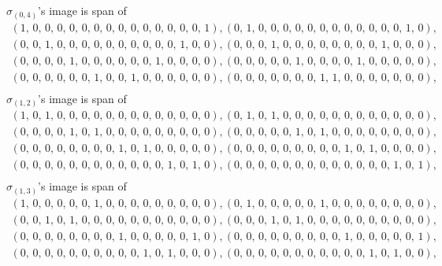 \documentclass[8pt]{article}\usepackage{amsmath}
\begin{document}
\( \sigma_{(0, 4)}\)'s image is span of   
\begin{align*} \left(1,\,0,\,0,\,0,\,0,\,0,\,0,\,0,\,0,\,0,\,0,\,0,\,0,\,0,\,0,\,1\right) , \left(0,\,1,\,0,\,0,\,0,\,0,\,0,\,0,\,0,\,0,\,0,\,0,\,0,\,0,\,1,\,0\right) , \\ 
 \left(0,\,0,\,1,\,0,\,0,\,0,\,0,\,0,\,0,\,0,\,0,\,0,\,0,\,1,\,0,\,0\right) , \left(0,\,0,\,0,\,1,\,0,\,0,\,0,\,0,\,0,\,0,\,0,\,0,\,1,\,0,\,0,\,0\right) , \\ 
 \left(0,\,0,\,0,\,0,\,1,\,0,\,0,\,0,\,0,\,0,\,0,\,1,\,0,\,0,\,0,\,0\right) , \left(0,\,0,\,0,\,0,\,0,\,1,\,0,\,0,\,0,\,0,\,1,\,0,\,0,\,0,\,0,\,0\right) , \\ 
 \left(0,\,0,\,0,\,0,\,0,\,0,\,1,\,0,\,0,\,1,\,0,\,0,\,0,\,0,\,0,\,0\right) , \left(0,\,0,\,0,\,0,\,0,\,0,\,0,\,1,\,1,\,0,\,0,\,0,\,0,\,0,\,0,\,0\right) , \\ \end{align*}
\( \sigma_{(1, 2)}\)'s image is span of   
\begin{align*} \left(1,\,0,\,1,\,0,\,0,\,0,\,0,\,0,\,0,\,0,\,0,\,0,\,0,\,0,\,0,\,0\right) , \left(0,\,1,\,0,\,1,\,0,\,0,\,0,\,0,\,0,\,0,\,0,\,0,\,0,\,0,\,0,\,0\right) , \\ 
 \left(0,\,0,\,0,\,0,\,1,\,0,\,1,\,0,\,0,\,0,\,0,\,0,\,0,\,0,\,0,\,0\right) , \left(0,\,0,\,0,\,0,\,0,\,1,\,0,\,1,\,0,\,0,\,0,\,0,\,0,\,0,\,0,\,0\right) , \\ 
 \left(0,\,0,\,0,\,0,\,0,\,0,\,0,\,0,\,1,\,0,\,1,\,0,\,0,\,0,\,0,\,0\right) , \left(0,\,0,\,0,\,0,\,0,\,0,\,0,\,0,\,0,\,1,\,0,\,1,\,0,\,0,\,0,\,0\right) , \\ 
 \left(0,\,0,\,0,\,0,\,0,\,0,\,0,\,0,\,0,\,0,\,0,\,0,\,1,\,0,\,1,\,0\right) , \left(0,\,0,\,0,\,0,\,0,\,0,\,0,\,0,\,0,\,0,\,0,\,0,\,0,\,1,\,0,\,1\right) , \\ \end{align*}
\( \sigma_{(1, 3)}\)'s image is span of   
\begin{align*} \left(1,\,0,\,0,\,0,\,0,\,0,\,1,\,0,\,0,\,0,\,0,\,0,\,0,\,0,\,0,\,0\right) , \left(0,\,1,\,0,\,0,\,0,\,0,\,0,\,1,\,0,\,0,\,0,\,0,\,0,\,0,\,0,\,0\right) , \\ 
 \left(0,\,0,\,1,\,0,\,1,\,0,\,0,\,0,\,0,\,0,\,0,\,0,\,0,\,0,\,0,\,0\right) , \left(0,\,0,\,0,\,1,\,0,\,1,\,0,\,0,\,0,\,0,\,0,\,0,\,0,\,0,\,0,\,0\right) , \\ 
 \left(0,\,0,\,0,\,0,\,0,\,0,\,0,\,0,\,1,\,0,\,0,\,0,\,0,\,0,\,1,\,0\right) , \left(0,\,0,\,0,\,0,\,0,\,0,\,0,\,0,\,0,\,1,\,0,\,0,\,0,\,0,\,0,\,1\right) , \\ 
 \left(0,\,0,\,0,\,0,\,0,\,0,\,0,\,0,\,0,\,0,\,1,\,0,\,1,\,0,\,0,\,0\right) , \left(0,\,0,\,0,\,0,\,0,\,0,\,0,\,0,\,0,\,0,\,0,\,1,\,0,\,1,\,0,\,0\right) , \\ \end{align*}
\end{document}
